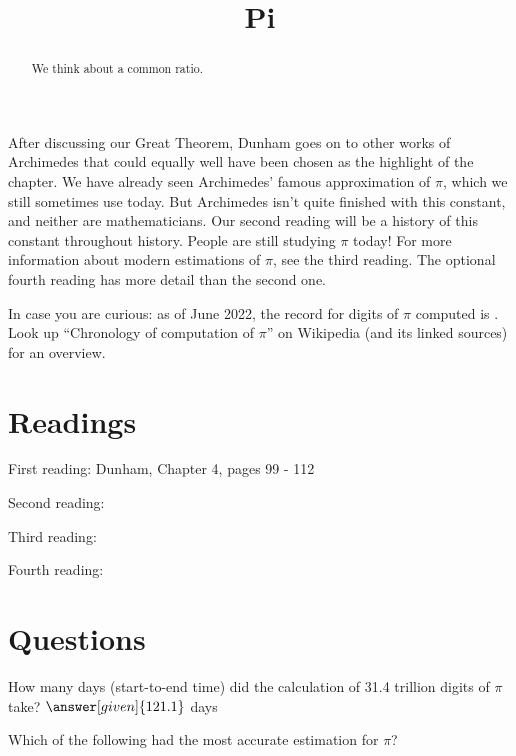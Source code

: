 \documentclass{ximera}
\title{Pi}
\begin{document}
\begin{abstract}
  We think about a common ratio.    
\end{abstract}
\maketitle

After discussing our Great Theorem, Dunham goes on to other works of Archimedes that could equally well have been chosen as the highlight of the chapter.   We have already seen Archimedes' famous approximation of $\pi$, which we still sometimes use today. But Archimedes isn't quite finished with this constant, and neither are mathematicians.  Our second reading will be a history of this constant throughout history.  People are still studying $\pi$ today!  For more information about modern estimations of $\pi$, see the third reading.  The optional fourth reading has more detail than the second one.

In case you are curious: as of June 2022, the record for digits of $\pi$ computed is .  Look up ``Chronology of computation of $\pi$'' on Wikipedia (and its linked sources) for an overview.


\section{Readings}
First reading: Dunham, Chapter 4, pages 99 - 112

Second reading: 

Third reading: 

Fourth reading: 

\section{Questions}

\begin{question}
How many days (start-to-end time) did the calculation of 31.4 trillion digits of $\pi$ take? $\answer[given]{121.1}$ days
\end{question}

\begin{question}
Which of the following had the most accurate estimation for $\pi$?
\begin{multipleChoice}
\end{multipleChoice}
\end{question}
\end{document}
